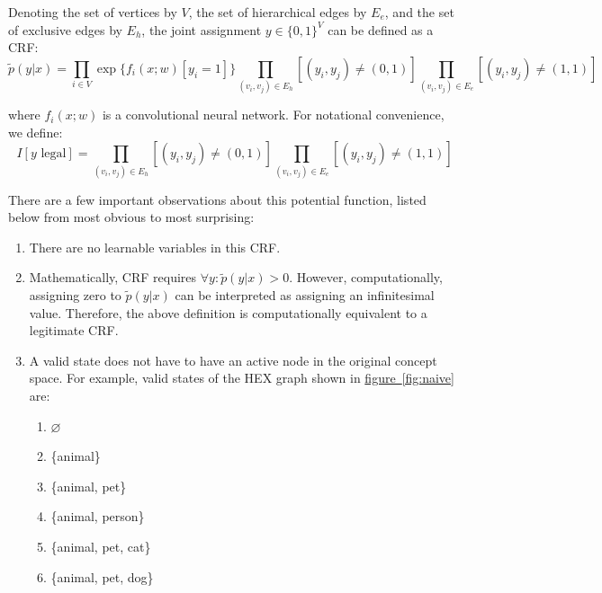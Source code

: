 \documentclass[11pt,a4paper]{article}
\begin{document}
Denoting the set of vertices by $V$, the set of hierarchical edges by $E_e$, and the set of exclusive edges by $E_h$, the joint assignment $y\in\{0,1\}^V$ can be defined as a CRF:
\[\tilde{p}(y|x)=\prod_{i\in V}\exp\{f_i(x;w)[y_i=1]\}\prod_{(v_i,v_j)\in E_h}[(y_i,y_j)\neq(0,1)]\prod_{(v_i,v_j)\in E_e}[(y_i,y_j)\neq(1,1)]\]

where $f_i(x;w)$ is a convolutional neural network. For notational convenience, we define:
\[I[y\text{ legal}]=\prod_{(v_i,v_j)\in E_h}[(y_i,y_j)\neq(0,1)]\prod_{(v_i,v_j)\in E_e}[(y_i,y_j)\neq(1,1)]\]

There are a few important observations about this potential function, listed below from most obvious to most surprising:
\begin{enumerate}
\item There are no learnable variables in this CRF.
\item Mathematically, CRF requires $\forall y:\tilde{p}(y|x)>0$. However, computationally, assigning zero to $\tilde{p}(y|x)$ can be interpreted as assigning an infinitesimal value. Therefore, the above definition is computationally equivalent to a legitimate CRF.
\item A valid state does not have to have an active node in the original concept space. For example, valid states of the HEX graph shown in \hyperref[fig:naive]{figure~\ref{fig:naive}} are:
\begin{enumerate}
\item $\varnothing$
\item \{animal\}
\item \{animal, pet\}
\item \{animal, person\}
\item \{animal, pet, cat\}
\item \{animal, pet, dog\}
\end{enumerate}


\end{enumerate}
\end{document}
